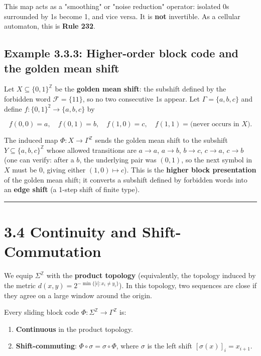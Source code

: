 This map acts as a "smoothing" or "noise reduction" operator: isolated 0s surrounded by 1s become 1, and vice versa. It is \textbf{not} invertible. As a cellular automaton, this is \textbf{Rule 232}.

\subsection{Example 3.3.3: Higher-order block code and the golden mean shift}

Let $X \subseteq \{ 0,1\} ^\mathbb{Z}$ be the \textbf{golden mean shift}: the subshift defined by the forbidden word $\mathcal{F} = \{ 11\} $, so no two consecutive 1s appear. Let $\Gamma = \{ a, b, c\} $ and define $f: \{ 0,1\} ^2 \to \{ a, b, c\} $ by

\[
f(0,0) = a, \quad f(0,1) = b, \quad f(1,0) = c, \quad f(1,1) = \text{(never occurs in } X\text{)}.
\]

The induced map $\Phi: X \to \Gamma^\mathbb{Z}$ sends the golden mean shift to the subshift $Y \subseteq \{ a,b,c\} ^\mathbb{Z}$ whose allowed transitions are $a \to a$, $a \to b$, $b \to c$, $c \to a$, $c \to b$ (one can verify: after a $b$, the underlying pair was $(0,1)$, so the next symbol in $X$ must be $0$, giving either $(1,0) \mapsto c$). This is the \textbf{higher block presentation} of the golden mean shift; it converts a subshift defined by forbidden words into an \textbf{edge shift} (a 1-step shift of finite type).

\bigskip\hrule\bigskip

\section{3.4 Continuity and Shift-Commutation}

We equip $\Sigma^\mathbb{Z}$ with the \textbf{product topology} (equivalently, the topology induced by the metric $d(x,y) = 2^{-\min\{ |i| : x_i \neq y_i\} }$). In this topology, two sequences are close if they agree on a large window around the origin.

\begin{proposition}
Every sliding block code $\Phi: \Sigma^\mathbb{Z} \to \Gamma^\mathbb{Z}$ is:
\end{proposition}

\begin{enumerate}
  \item \textbf{Continuous} in the product topology.
  \item \textbf{Shift-commuting}: $\Phi \circ \sigma = \sigma \circ \Phi$, where $\sigma$ is the left shift $[\sigma(x)]_i = x_{i+1}$.
\end{enumerate}

